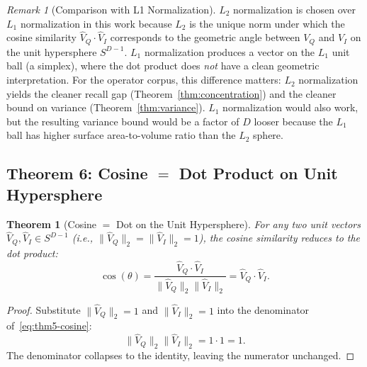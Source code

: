 \documentclass[10pt,twocolumn]{article}
\newtheorem{theorem}{Theorem}
\theoremstyle{definition}
\theoremstyle{remark}
\newtheorem{remark}{Remark}
\begin{document}
\begin{remark}[Comparison with L1 Normalization]
\label{rem:l1-vs-l2}
$L_2$ normalization is chosen over $L_1$ normalization in this work
because $L_2$ is the unique norm under which the cosine similarity
$\hat{V}_Q \cdot \hat{V}_I$ corresponds to the geometric angle between
$V_Q$ and $V_I$ on the unit hypersphere $S^{D-1}$. $L_1$ normalization
produces a vector on the $L_1$ unit ball (a simplex), where the dot
product does \emph{not} have a clean geometric interpretation. For
the operator corpus, this difference matters: $L_2$ normalization
yields the cleaner recall gap (Theorem~\ref{thm:concentration}) and
the cleaner bound on variance (Theorem~\ref{thm:variance}). $L_1$
normalization would also work, but the resulting variance bound would
be a factor of $D$ looser because the $L_1$ ball has higher surface
area-to-volume ratio than the $L_2$ sphere.
\end{remark}

\subsection{Theorem 6: Cosine $=$ Dot Product on Unit Hypersphere}
\label{thm:cosine-dot}

\begin{theorem}[Cosine $=$ Dot on the Unit Hypersphere]
\label{thm:cosine-dot}
For any two unit vectors $\hat{V}_Q, \hat{V}_I \in S^{D-1}$ (i.e.,
$\|\hat{V}_Q\|_2 = \|\hat{V}_I\|_2 = 1$), the cosine similarity reduces
to the dot product:
\begin{equation}
\cos(\theta) = \frac{\hat{V}_Q \cdot \hat{V}_I}
                    {\|\hat{V}_Q\|_2 \|\hat{V}_I\|_2}
             = \hat{V}_Q \cdot \hat{V}_I.
\label{eq:thm6-cosine-dot}
\end{equation}
\end{theorem}

\begin{proof}
Substitute $\|\hat{V}_Q\|_2 = 1$ and $\|\hat{V}_I\|_2 = 1$ into the
denominator of~\eqref{eq:thm5-cosine}:
\begin{equation}
\|\hat{V}_Q\|_2 \|\hat{V}_I\|_2 = 1 \cdot 1 = 1.
\end{equation}
The denominator collapses to the identity, leaving the numerator
unchanged. \qedhere
\end{proof}
\end{document}
